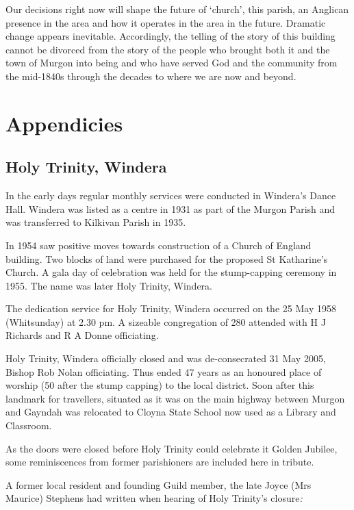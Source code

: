 Our decisions right now will shape the future of `church', this parish, an Anglican presence in the area and how it operates in the area in the future. Dramatic change appears inevitable. Accordingly, the telling of the story of this building cannot be divorced from the story of the people who brought both it and the town of Murgon into being and who have served God and the community from the mid-1840s through the decades to where we are now and beyond.

\hypertarget{appendicies}{%
\chapter{Appendicies}\label{appendicies}}

\hypertarget{holy-trinity-windera-1}{%
\section{Holy Trinity, Windera}\label{holy-trinity-windera-1}}

In the early days regular monthly services were conducted in Windera's Dance Hall. Windera was listed as a centre in 1931 as part of the Murgon Parish and was transferred to Kilkivan Parish in 1935.

In 1954 saw positive moves towards construction of a Church of England building. Two blocks of land were purchased for the proposed St Katharine's Church. A gala day of celebration was held for the stump-capping ceremony in 1955. The name was later Holy Trinity, Windera.

The dedication service for Holy Trinity, Windera occurred on the 25 May 1958 (Whitsunday) at 2.30 pm. A sizeable congregation of 280 attended with H J Richards and R A Donne officiating.

Holy Trinity, Windera officially closed and was de-consecrated 31 May 2005, Bishop Rob Nolan officiating. Thus ended 47 years as an honoured place of worship (50 after the stump capping) to the local district. Soon after this landmark for travellers, situated as it was on the main highway between Murgon and Gayndah was relocated to Cloyna State School now used as a Library and Classroom.

As the doors were closed before Holy Trinity could celebrate it Golden Jubilee, some reminiscences from former parishioners are included here in tribute.

A former local resident and founding Guild member, the late Joyce (Mrs Maurice) Stephens had written when hearing of Holy Trinity's closure\emph{:}


